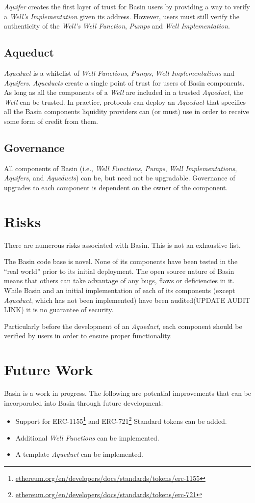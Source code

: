 \documentclass[tikz]{article}
\newcommand{\term}[1]{\textsl{#1}}
\newcommand{\fref}[1]{\footnote{\href{http://#1}{#1}}}
\begin{document}
\term{Aquifer} creates the first layer of trust for Basin users by providing a way to verify a \term{Well's} \term{Implementation} given its address. However, users must still verify the authenticity of the \term{Well's} \term{Well Function}, \term{Pumps} and \term{Well Implementation}.

\subsection{Aqueduct}
\term{Aqueduct} is a whitelist of \term{Well Functions}, \term{Pumps}, \term{Well Implementations} and \term{Aquifers}. \term{Aqueducts} create a single point of trust for users of Basin components. As long as all the components of a \term{Well} are included in a trusted \term{Aqueduct}, the \term{Well} can be trusted. In practice, protocols can deploy an \term{Aqueduct} that specifies all the Basin components liquidity providers can (or must) use in order to receive some form of credit from them. 

\subsection{Governance}
All components of Basin (i.e., \term{Well Functions}, \term{Pumps}, \term{Well Implementations},  \term{Aquifers}, and \term{Aqueducts}) can be, but need not be upgradable. Governance of upgrades to each component is dependent on the owner of the component. 

\section{Risks}
There are numerous risks associated with Basin. This is not an exhaustive list.

The Basin code base is novel. None of its components have been tested in the “real world” prior to its initial deployment. The open source nature of Basin means that others can take advantage of any bugs, flaws or deficiencies in it. While Basin and an initial implementation of each of its components (except \term{Aqueduct}, which has not been implemented) have been audited(UPDATE AUDIT LINK) it is no guarantee of security. 

Particularly before the development of an \term{Aqueduct}, each component should be verified by users in order to ensure proper functionality. 

\section{Future Work}
Basin is a work in progress. The following are potential improvements that can be incorporated into Basin through future development:

\begin{itemize}
\item Support for ERC-1155\fref{ethereum.org/en/developers/docs/standards/tokens/erc-1155} and ERC-721\fref{ethereum.org/en/developers/docs/standards/tokens/erc-721} Standard tokens can be added.
\item Additional \term{Well Functions} can be implemented.
\item A template \term{Aqueduct} can be implemented.
\end{itemize}
\end{document}
